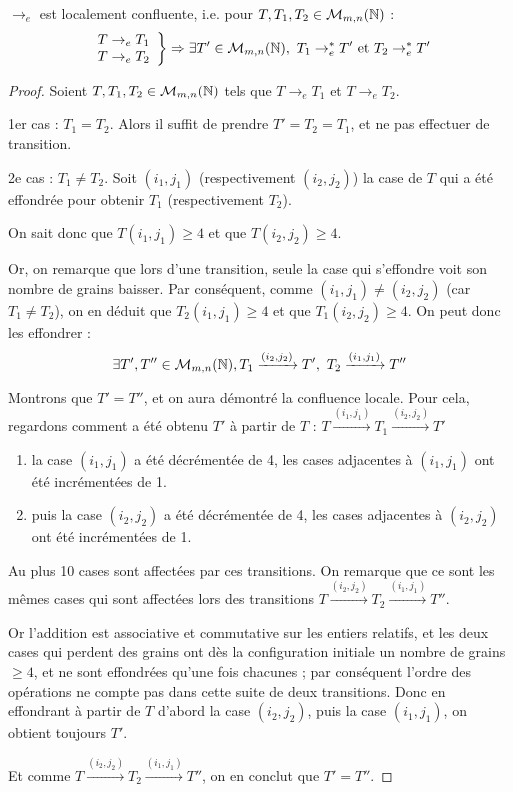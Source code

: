 \begin{lem}
$\rightarrow_e$ est localement confluente, i.e. pour $T, T_1, T_2\in\mathcal{M}_{m,n}(\mathbb{N})$ : 
$$\left.\begin{array}{ll}T\rightarrow_eT_1\\T\rightarrow_eT_2\end{array}\right\}\Rightarrow \exists T'\in\mathcal{M}_{m,n}(\mb{N}),\ T_1\rightarrow_e^*T' \mathrm{\ et\ }T_2\rightarrow_e^*T'$$
\end{lem}
\begin{proof}
Soient $T, T_1, T_2\in\mathcal{M}_{m,n}(\mathbb{N})$ tels que $T\rightarrow_eT_1$ et $T\rightarrow_eT_2$.

1er cas : $T_1=T_2$. Alors il suffit de prendre $T'=T_2=T_1$, et ne pas effectuer de transition.

2e cas : $T_1\not = T_2$. Soit $(i_1, j_1)$ (respectivement $(i_2, j_2)$) la case de $T$ qui a été effondrée pour obtenir $T_1$ (respectivement $T_2$).

On sait donc que $T(i_1, j_1)\geqslant 4$ et que $T(i_2, j_2)\geqslant 4$.

Or, on remarque que lors d'une transition, seule la case qui s'effondre voit son nombre de grains baisser. Par conséquent, comme $(i_1, j_1)\not = (i_2, j_2)$ (car $T_1\not=T_2$), on en déduit que $T_2(i_1, j_1)\geqslant 4$ et que $T_1(i_2, j_2)\geqslant 4$. On peut donc les effondrer : 
$$\exists T', T''\in\mathcal{M}_{m,n}(\mb{N}), T_1\xrightarrow{(i_2,j_2)}T',\ T_2\xrightarrow{(i_1,j_1)}T'' $$

Montrons que $T'=T''$, et on aura démontré la confluence locale. Pour cela, regardons comment a été obtenu $T'$ à partir de $T$ : $T\xrightarrow{(i_1,j_1)}T_1\xrightarrow{(i_2,j_2)}T'$
\begin{enumerate}
\item la case $(i_1,j_1)$ a été décrémentée de 4, les cases adjacentes à $(i_1,j_1)$ ont été incrémentées de 1.
\item puis la case $(i_2,j_2)$ a été décrémentée de 4, les cases adjacentes à $(i_2,j_2)$ ont été incrémentées de 1.
\end{enumerate}

Au plus 10 cases sont affectées par ces transitions. On remarque que ce sont les mêmes cases qui sont affectées lors des transitions $T\xrightarrow{(i_2,j_2)}T_2\xrightarrow{(i_1,j_1)}T''$.

Or l'addition est associative et commutative sur les entiers relatifs, et les deux cases qui perdent des grains ont dès la configuration initiale un nombre de grains $\geqslant 4$, et ne sont effondrées qu'une fois chacunes ; par conséquent l'ordre des opérations ne compte pas dans cette suite de deux transitions. Donc en effondrant à partir de $T$ d'abord la case $(i_2,j_2)$, puis la case $(i_1,j_1)$, on obtient toujours $T'$.

Et comme $T\xrightarrow{(i_2,j_2)}T_2\xrightarrow{(i_1,j_1)}T''$, on en conclut que $T'=T''$.

\end{proof}

